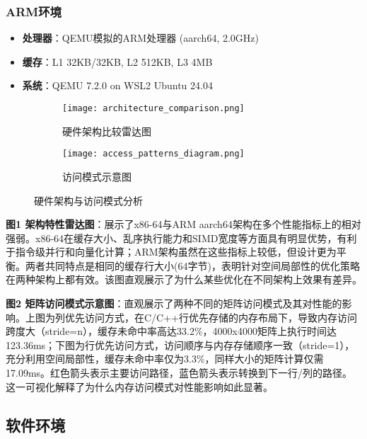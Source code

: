 \documentclass[a4paper,colorlinks=true,linkcolor=blue,urlcolor=blue,citecolor=green,bookmarks=true]{article}
\begin{document}
\subsubsection{ARM环境}
\begin{itemize}
  \item \textbf{处理器}：QEMU模拟的ARM处理器 (aarch64, 2.0GHz)
  \item \textbf{缓存}：L1 32KB/32KB, L2 512KB, L3 4MB
  \item \textbf{系统}：QEMU 7.2.0 on WSL2 Ubuntu 24.04
\end{itemize}

\begin{figure}[htbp]
  \centering
  \begin{subfigure}[b]{0.48\textwidth}
    \centering
    \texttt{[image: architecture\_comparison.png]}
    \caption{硬件架构比较雷达图}
    \label{fig:hardware_config}
  \end{subfigure}
  \hfill
  \begin{subfigure}[b]{0.48\textwidth}
    \centering
    \texttt{[image: access\_patterns\_diagram.png]}
    \caption{访问模式示意图}
    \label{fig:access_patterns}
  \end{subfigure}
  \caption{硬件架构与访问模式分析}
  \label{fig:hardware_access}
\end{figure}

\textbf{图1 架构特性雷达图}：展示了x86-64与ARM aarch64架构在多个性能指标上的相对强弱。x86-64在缓存大小、乱序执行能力和SIMD宽度等方面具有明显优势，有利于指令级并行和向量化计算；ARM架构虽然在这些指标上较低，但设计更为平衡。两者共同特点是相同的缓存行大小(64字节)，表明针对空间局部性的优化策略在两种架构上都有效。该图直观展示了为什么某些优化在不同架构上效果有差异。

\textbf{图2 矩阵访问模式示意图}：直观展示了两种不同的矩阵访问模式及其对性能的影响。上图为列优先访问方式，在C/C++行优先存储的内存布局下，导致内存访问跨度大（stride=n），缓存未命中率高达33.2\%，4000x4000矩阵上执行时间达123.36ms；下图为行优先访问方式，访问顺序与内存存储顺序一致（stride=1），充分利用空间局部性，缓存未命中率仅为3.3\%，同样大小的矩阵计算仅需17.09ms。红色箭头表示主要访问路径，蓝色箭头表示转换到下一行/列的路径。这一可视化解释了为什么内存访问模式对性能影响如此显著。

\subsection{软件环境}
\end{document}

